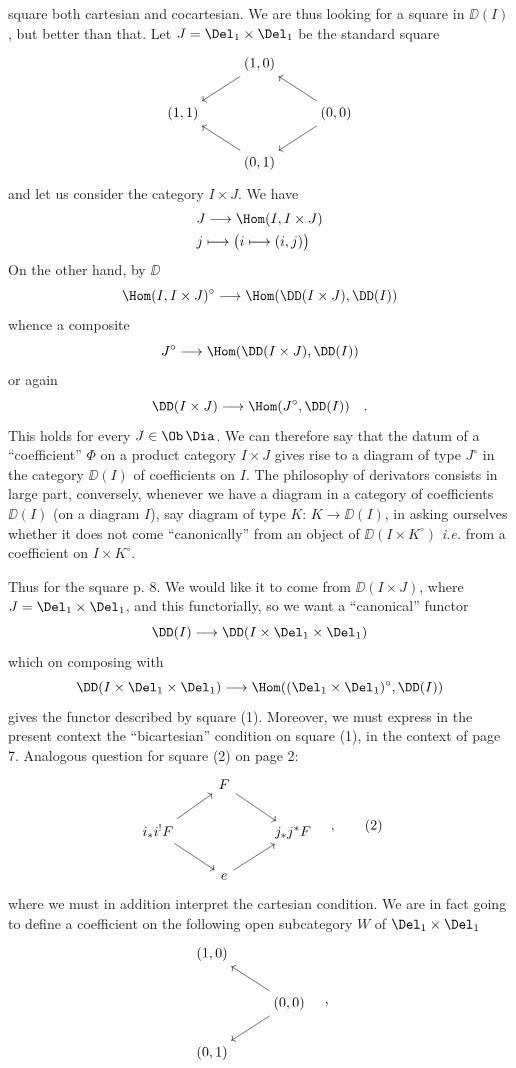 square both cartesian and cocartesian. We are thus looking for a square in $\DD(I)$, but better than that. Let $J = \Del_1 \times \Del_1$ be the standard square
\[
\begin{tikzcd}
& (1,0) \arrow[dl] & \\
(1,1) & & (0,0) \arrow[ul] \arrow[dl] \\
& (0,1) \arrow[ul] &
\end{tikzcd}
\]
and let us consider the category $I \times J$. We have
\[
\begin{aligned}
& J \longrightarrow \Hom(I, I \times J) \\
& j \longmapsto \bigl(i \longmapsto (i,j)\bigr)
\end{aligned}
\]
On the other hand, by $\DD$
\[ \Hom(I, I \times J)^{\circ} \longrightarrow \Hom(\DD(I \times J), \DD(I)) \]
whence a composite
\[ J^{\circ} \longrightarrow \Hom(\DD(I \times J), \DD(I)) \]
or again
\[ \DD(I \times J) \longrightarrow \Hom(J^{\circ}, \DD(I)) \quad . \]
This holds for every $J \in \Ob \, \Dia$. We can therefore say that the datum of a ``coefficient'' $\Phi$ on a product category $I \times J$ gives rise to a diagram of type $J^{\circ}$ in the category $\DD(I)$ of coefficients on $I$. The philosophy
of derivators consists in large part, conversely, whenever we have a diagram in a category of coefficients $\DD(I)$ (on a diagram $I$), say diagram of type $K$: $K \to \DD(I)$, in asking ourselves whether it does not come ``canonically'' from an object of $\DD(I \times K^{\circ})$ \textit{i.e.} from a coefficient on $I \times K^{\circ}$.

Thus for the square p. 8. We would like it to come from $\DD(I \times J)$, where $J = \Del_1 \times \Del_1$, and this functorially, so we want a ``canonical'' functor
\[ \DD(I) \longrightarrow \DD(I \times \Del_1 \times \Del_1) \]
which on composing with
\[ \DD(I \times \Del_1 \times \Del_1) \longrightarrow \Hom((\Del_1 \times \Del_1)^{\circ}, \DD(I)) \]
gives the functor described by square (1). Moreover, we must express in the present context the ``bicartesian'' condition on square (1), in the context of page 7. Analogous question for square (2) on page 2:
\[
\begin{tikzcd}
& F \arrow[dr] & \\
i_*i^!F \arrow[ur] \arrow[dr] & & j_*j^*F \\
& e \arrow[ur] &
\end{tikzcd}
\quad ,
\tag*{(2)}
\]
where we must in addition interpret the cartesian condition. We are in fact going to define a coefficient on the following open subcategory $W$ of $\Del_1 \times \Del_1$
\[
\begin{tikzcd}
(1,0) & \\
& (0,0) \arrow[ul] \arrow[dl] \\
(0,1) &
\end{tikzcd}
\quad ,
\]

